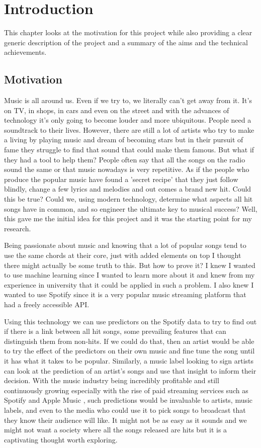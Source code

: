 \chapter{Introduction}

This chapter looks at the motivation for this project while also providing a clear generic description of the project and a summary of the aims and the technical achievements.

\section{Motivation}
Music is all around us. Even if we try to, we literally can't get away from it. It's on TV, in shops, in cars and even on the street and with the advances of technology it's only going to become louder and more ubiquitous. People need a soundtrack to their lives. However, there are still a lot of artists who try to make a living by playing music and dream of becoming stars but in their pursuit of fame they struggle to find that sound that could make them famous. But what if they had a tool to help them? People often say that all the songs on the radio sound the same or that music nowadays is very repetitive. As if the people who produce the popular music have found a 'secret recipe' that they just follow blindly, change a few lyrics and melodies and out comes a brand new hit. Could this be true? Could we, using modern technology, determine what aspects all hit songs have in common, and so engineer the ultimate key to musical success? Well, this gave me the initial idea for this project and it was the starting point for my research.

Being passionate about music and knowing that a lot of popular songs tend to use the same chords at their core, just with added elements on top I thought there might actually be some truth to this. But how to prove it? I knew I wanted to use machine learning since I wanted to learn more about it and knew from my experience in university that it could be applied in such a problem. I also knew I wanted to use Spotify since it is a very popular music streaming platform that had a freely accessible API.

Using this technology we can use predictors on the Spotify data to try to find out if there is a link between all hit songs, some prevailing features that can distinguish them from non-hits. If we could do that, then an artist would be able to try the effect of the predictors on their own music and fine tune the song until it has what it takes to be popular. Similarly, a music label looking to sign artists can look at the prediction of an artist's songs and use that insight to inform their decision. With the music industry being incredibly profitable and still continuously growing especially with the rise of paid streaming services such as Spotify and Apple Music \cite{USMusicI78:online}, such predictions would be invaluable to artists, music labels, and even to the media who could use it to pick songs to broadcast that they know their audience will like. It might not be as easy as it sounds and we might not want a society where all the songs released are hits but it is a captivating thought worth exploring.


